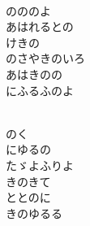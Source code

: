 \documentclass[10pt,b5j]{tarticle} %
\begin{document}
\begin{enumerate}
\begin{minipage}[c]{\blocksize}
        \vspace{\linespace}
        \item~\\
        のののよ\\
        あはれるとの\\
        けきの\\
        のさやきのいろ\\
        あはきのの\\
        にふるふのよ
        
    \end{minipage}
    \begin{minipage}[c]{\blocksize}
        
        \vspace{\linespace}
        \item~\\
        のく\\
        にゆるの\\
        たゞよふりよ\\
        きのきて\\
        ととのに\\
        きのゆるる
    
    \end{minipage}
\end{enumerate} %
\end{document}
